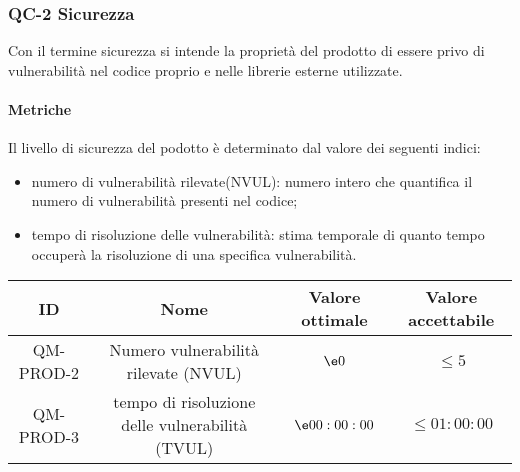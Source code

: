 \subsubsection{QC-2 Sicurezza}
Con il termine sicurezza si intende la proprietà del prodotto di essere privo di vulnerabilità nel codice proprio e nelle librerie esterne utilizzate.

	\paragraph{Metriche}
	Il livello di sicurezza del podotto è determinato dal valore dei seguenti indici:
	\begin{itemize}
		\item numero di vulnerabilità rilevate(NVUL): numero intero che quantifica il numero di vulnerabilità presenti nel codice;
		\item tempo di risoluzione delle vulnerabilità: stima temporale di quanto tempo occuperà la risoluzione di una specifica vulnerabilità.
	\end{itemize}
	\begin{center}
		\begin{tabular}{|c|c|c|c|}
			\rowcolor{lighter-grayer}
			\hline
			ID & Nome & Valore ottimale & Valore accettabile \\
			\hline
			QM-PROD-2 & Numero vulnerabilità rilevate (NVUL) & \(\e 0\) & \(\le 5\) \\
			\hline
			QM-PROD-3 & tempo di risoluzione delle vulnerabilità (TVUL) & \(\e 00:00:00\) &  \(\le 01:00:00\) \\
			\hline
		\end{tabular}
	\end{center}
